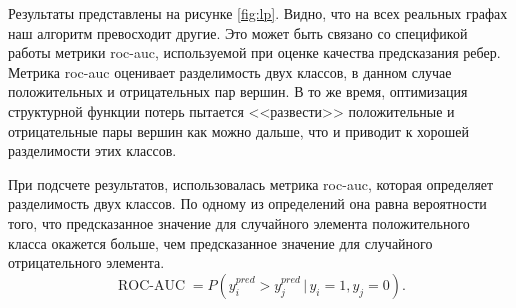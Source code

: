 \documentclass[12pt,a4paper]{extarticle}
\begin{document}
    Результаты представлены на рисунке \ref{fig:lp}. Видно, что на всех реальных графах наш алгоритм превосходит другие. Это может быть связано со спецификой работы метрики roc-auc, используемой при оценке качества предсказания ребер.
    Метрика roc-auc оценивает разделимость двух классов, в данном случае положительных и отрицательных пар вершин. В то же время, оптимизация структурной функции потерь пытается <<развести>> положительные и отрицательные пары вершин как можно дальше, что и приводит к хорошей разделимости этих классов.
    
    При подсчете результатов, использовалась метрика roc-auc, которая определяет разделимость двух классов.
    По одному из определений она равна вероятности того, что предсказанное значение для случайного элемента положительного класса окажется больше, чем предсказанное значение для случайного отрицательного элемента. 
    \[
        \operatorname{ROC-AUC} = P(y^{pred}_i > y^{pred}_j \, | \, y_i = 1, y_j = 0).
    \]
    
\end{document}
